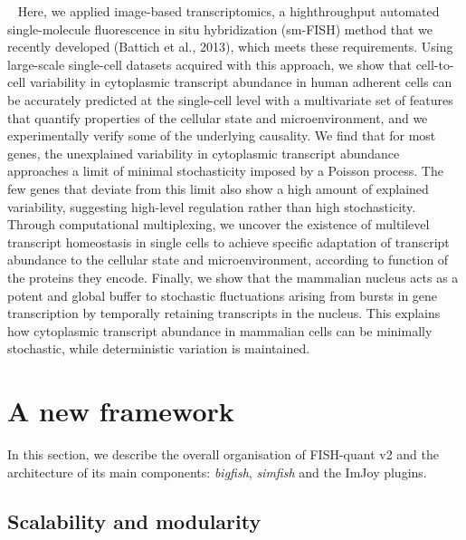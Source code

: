 ~\cite{battich_control_2015}
Here, we applied image-based transcriptomics, a highthroughput automated
single-molecule fluorescence in situ hybridization (sm-FISH) method that we
recently developed (Battich et al., 2013), which meets these requirements.
Using large-scale single-cell datasets acquired with this approach, we show
that cell-to-cell variability in cytoplasmic transcript abundance in human
adherent cells can be accurately predicted at the single-cell level with a
multivariate set of features that quantify properties of the cellular state
and microenvironment, and we experimentally verify some of the underlying
causality. We find that for most genes, the unexplained variability in cytoplasmic
transcript abundance approaches a limit of minimal stochasticity imposed by a
Poisson process. The few genes that deviate from this limit also show a high
amount of explained variability, suggesting high-level regulation rather than
high stochasticity. Through computational multiplexing, we uncover the existence
of multilevel transcript homeostasis in single cells to achieve specific
adaptation of transcript abundance to the cellular state and microenvironment,
according to function of the proteins they encode. Finally, we show that the
mammalian nucleus acts as a potent and global buffer to stochastic fluctuations
arising from bursts in gene transcription by temporally retaining transcripts
in the nucleus. This explains how cytoplasmic transcript abundance in mammalian
cells can be minimally stochastic, while deterministic variation is maintained.





\section{A new framework}
\label{sec:fqv2}

In this section, we describe the overall organisation of FISH-quant v2 and the architecture of its main components: \emph{bigfish}, \emph{simfish} and the ImJoy plugins.

\subsection{Scalability and modularity}
\label{subsec:framework}

